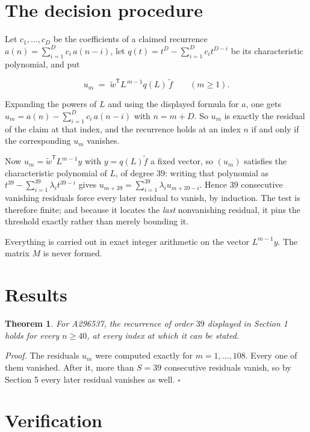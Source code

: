 \documentclass[11pt]{article}
\newtheorem{theorem}{Theorem}
\theoremstyle{definition}
\begin{document}
\section{The decision procedure}

Let $c_1,\dots,c_D$ be the coefficients of a claimed recurrence $a(n) = \sum_{i=1}^{D} c_i\,a(n-i)$, let $q(t) = t^{D} - \sum_{i=1}^{D} c_i t^{D-i}$ be its characteristic polynomial, and put

\[u_m \;=\; \tilde w^{\mathsf T} L^{\,m-1} q(L)\,\tilde f \qquad (m \ge 1).\]

Expanding the powers of $L$ and using the displayed formula for $a$, one gets $u_m = a(n) - \sum_{i=1}^{D} c_i\,a(n-i)$ with $n = m + D$. So $u_m$ is exactly the residual of the claim at that index, and the recurrence holds at an index $n$ if and only if the corresponding $u_m$ vanishes.

Now $u_m = \tilde w^{\mathsf T} L^{m-1} y$ with $y = q(L)\tilde f$ a fixed vector, so $(u_m)$ satisfies the characteristic polynomial of $L$, of degree $39$: writing that polynomial as $t^{39} - \sum_{i=1}^{39} \lambda_i t^{39-i}$ gives $u_{m+39} = \sum_{i=1}^{39} \lambda_i u_{m+39-i}$. Hence $39$ consecutive vanishing residuals force every later residual to vanish, by induction. The test is therefore finite; and because it locates the {\itshape last} nonvanishing residual, it pins the threshold exactly rather than merely bounding it.

Everything is carried out in exact integer arithmetic on the vector $L^{m-1}y$. The matrix $M$ is never formed.

\section{Results}

\begin{theorem} For A296537, the recurrence of order $39$ displayed in Section 1 holds for every $n \ge 40$, at every index at which it can be stated.\end{theorem}

{\itshape Proof.} The residuals $u_m$ were computed exactly for $m = 1,\dots,108$. Every one of them vanished. After it, more than $S = 39$ consecutive residuals vanish, so by Section 5 every later residual vanishes as well. $\square$

\section{Verification}
\end{document}
